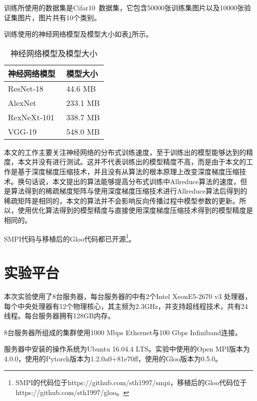 训练所使用的数据集是Cifar10~\cite{krizhevsky2009learning}数据集，它包含50000张训练集图片以及10000张验证集图片，图片共有10个类别。

训练使用的神经网络模型及模型大小如表\ref{tab:models}所示。

\begin{table}[htb]
    \centering
    \caption{神经网络模型及模型大小}
    \label{tab:models}
    \begin{tabularx}{\linewidth}{  p{7cm}<{\centering}   p{7cm}<{\centering}}
        \toprule[1.5pt]
        {神经网络模型} & {模型大小}\\\midrule[1pt]
        ResNet-18~\cite{he2016deep} & 44.6 MB \\
        AlexNet~\cite{krizhevsky2014one} & 233.1 MB \\
        RexNeXt-101~\cite{xie2017aggregated} & 338.7 MB \\
        VGG-19~\cite{simonyan2014very} & 548.0 MB \\
        \bottomrule[1.5pt]
    \end{tabularx}
\end{table}

本文的工作主要关注神经网络的分布式训练速度，至于训练出的模型能够达到的精度，本文并没有进行测试。这并不代表训练出的模型精度不高，而是由于本文的工作是基于深度梯度压缩技术，并且没有从算法的根本原理上改变深度梯度压缩技术。换句话说，本文提出的算法能够提高分布式训练中Allreduce算法的速度，但是算法得到的稀疏梯度矩阵与使用深度梯度压缩技术进行Allreduce算法后得到的稀疏矩阵是相同的，本文的算法并不会影响反向传播过程中模型参数的更新。所以，使用优化算法得到的模型精度与直接使用深度梯度压缩技术得到的模型精度是相同的。

SMPI代码与移植后的Gloo代码都已开源\footnote{SMPI的代码位于https://github.com/sth1997/smpi，移植后的Gloo代码位于https://github.com/sth1997/gloo。}。

\section{实验平台}
本次实验使用了8台服务器，每台服务器的中有2个Intel XeonE5-2670 v3 处理器，每个中央处理器有12个物理核心，其主频为2.3GHz，并支持超线程技术，共有24线程。每台服务器拥有128GB内存。

8台服务器所组成的集群使用1000 Mbps Ethernet与100 Gbps Infiniband连接。

服务器中安装的操作系统为Ubuntu 16.04.4 LTS。实验中使用的Open MPI版本为4.0.0，使用的Pytorch版本为1.2.0a0+81e70ff，使用的Gloo版本为0.5.0。

